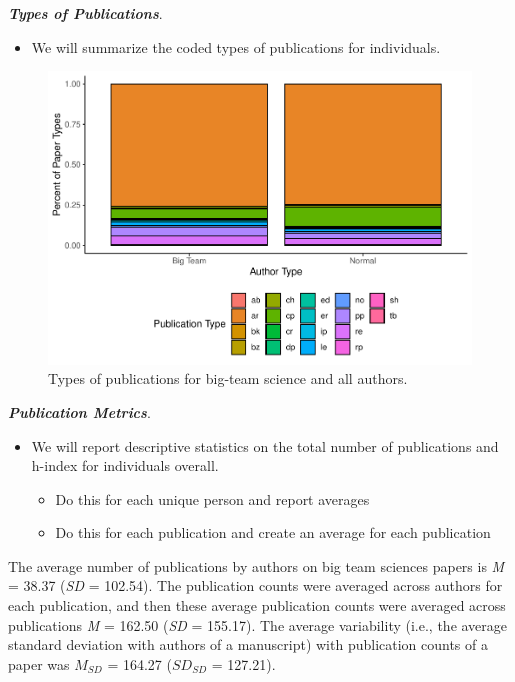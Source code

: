 \documentclass[
  man]{apa7}
\providecommand{\tightlist}{%
  \setlength{\itemsep}{0pt}\setlength{\parskip}{0pt}}
\begin{document}
\textbf{\emph{Types of Publications}}.

\begin{itemize}
\tightlist
\item
  We will summarize the coded types of publications for individuals.
\end{itemize}

\begin{figure}
\centering
\includegraphics{manuscript_scopus_files/figure-latex/fig-pub-types-1.pdf}
\caption{\label{fig:fig-pub-types}Types of publications for big-team science and all authors.}
\end{figure}

\textbf{\emph{Publication Metrics}}.

\begin{itemize}
\tightlist
\item
  We will report descriptive statistics on the total number of
  publications and h-index for individuals overall.

  \begin{itemize}
  \tightlist
  \item
    Do this for each unique person and report averages
  \item
    Do this for each publication and create an average for each
    publication
  \end{itemize}
\end{itemize}

The average number of publications by authors on big team sciences
papers is \emph{M} = 38.37 (\emph{SD} =
102.54). The publication counts were averaged across
authors for each publication, and then these average publication counts
were averaged across publications \emph{M} = 162.50 (\emph{SD} =
155.17). The average variability (i.e., the average
standard deviation with authors of a manuscript) with publication counts
of a paper was \(M_{SD}\) = 164.27 (\(SD_{SD}\) =
127.21).
\end{document}
